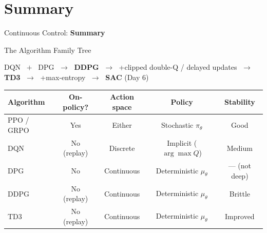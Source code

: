 \section{Summary}
\begin{frame}{}
    \LARGE Continuous Control: \textbf{Summary}
\end{frame}

\begin{frame}{The Algorithm Family Tree}
\begin{center}
DQN $\;+\;$ DPG $\;\rightarrow\;$ \textbf{DDPG} $\;\rightarrow\;$ +clipped double-Q / delayed updates $\;\rightarrow\;$ \textbf{TD3} $\;\rightarrow\;$ +max-entropy $\;\rightarrow\;$ \textbf{SAC} (Day 6)
\end{center}

\vspace{0.6em}

\begin{table}[]
    \centering
    \renewcommand{\arraystretch}{1.8}
    \small
    \begin{tabular}{lcccc}
        \hline
        \textbf{Algorithm} & \textbf{On-policy?} & \textbf{Action space} & \textbf{Policy} & \textbf{Stability} \\
        \hline
        PPO / GRPO & Yes         & Either              & Stochastic $\pi_\theta$ & Good \\
        DQN   & No (replay) & Discrete            & Implicit ($\arg\max Q$) & Medium \\
        DPG   & No          & Continuous          & Deterministic $\mu_\theta$ & --- (not deep) \\
        DDPG  & No (replay) & Continuous          & Deterministic $\mu_\theta$ & Brittle \\
        TD3   & No (replay) & Continuous          & Deterministic $\mu_\theta$ & Improved \\
        \hline
    \end{tabular}
\end{table}
\end{frame}

